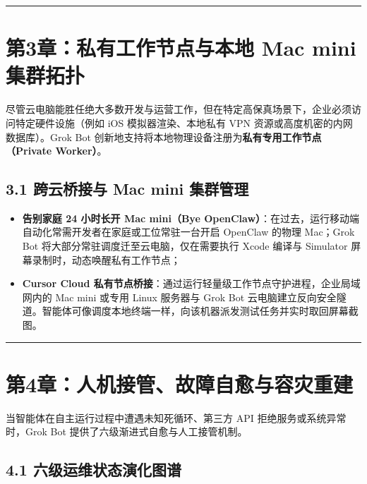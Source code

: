 \documentclass[10.5pt,a4paper,oneside]{report}
\providecommand{\tightlist}{\setlength{\itemsep}{0pt}\setlength{\parskip}{0pt}}
\begin{document}
\begin{center}\rule{0.5\linewidth}{0.5pt}\end{center}

\section{第3章：私有工作节点与本地 Mac mini
集群拓扑}\label{ux7b2c3ux7ae0ux79c1ux6709ux5de5ux4f5cux8282ux70b9ux4e0eux672cux5730-mac-mini-ux96c6ux7fa4ux62d3ux6251}

尽管云电脑能胜任绝大多数开发与运营工作，但在特定高保真场景下，企业必须访问特定硬件设施（例如
iOS 模拟器渲染、本地私有 VPN 资源或高度机密的内网数据库）。Grok Bot
创新地支持将本地物理设备注册为\textbf{私有专用工作节点（Private
Worker）}。

\subsection{3.1 跨云桥接与 Mac mini
集群管理}\label{ux8de8ux4e91ux6865ux63a5ux4e0e-mac-mini-ux96c6ux7fa4ux7ba1ux7406}

\begin{itemize}
\tightlist
\item
  \textbf{告别家庭 24 小时长开 Mac mini（Bye
  OpenClaw）}：在过去，运行移动端自动化常需开发者在家庭或工位常驻一台开启
  OpenClaw 的物理 Mac；Grok Bot 将大部分常驻调度迁至云电脑，仅在需要执行
  Xcode 编译与 Simulator 屏幕录制时，动态唤醒私有工作节点；
\item
  \textbf{Cursor Cloud
  私有节点桥接}：通过运行轻量级工作节点守护进程，企业局域网内的 Mac mini
  或专用 Linux 服务器与 Grok Bot
  云电脑建立反向安全隧道。智能体可像调度本地终端一样，向该机器派发测试任务并实时取回屏幕截图。
\end{itemize}

\begin{center}\rule{0.5\linewidth}{0.5pt}\end{center}

\section{第4章：人机接管、故障自愈与容灾重建}\label{ux7b2c4ux7ae0ux4ebaux673aux63a5ux7ba1ux6545ux969cux81eaux6108ux4e0eux5bb9ux707eux91cdux5efa}

当智能体在自主运行过程中遭遇未知死循环、第三方 API
拒绝服务或系统异常时，Grok Bot 提供了六级渐进式自愈与人工接管机制。

\subsection{4.1
六级运维状态演化图谱}\label{ux516dux7ea7ux8fd0ux7ef4ux72b6ux6001ux6f14ux5316ux56feux8c31}
\end{document}
